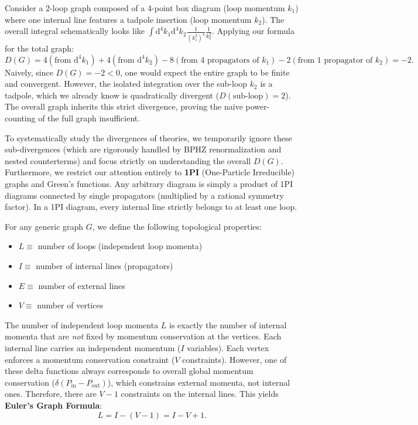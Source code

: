 \begin{example}
    Consider a 2-loop graph composed of a 4-point box diagram (loop momentum $k_1$) where one internal line features a tadpole insertion (loop momentum $k_2$).
    The overall integral schematically looks like $\int \mathrm{d}^4k_1 \mathrm{d}^4k_2 \frac{1}{(k_1^2)^4} \frac{1}{k_2^2}$.
    Applying our formula for the total graph:
    \[
        D(G) = 4 (\text{from } \mathrm{d}^4k_1) + 4 (\text{from } \mathrm{d}^4k_2) - 8 (\text{from } 4 \text{ propagators of } k_1) - 2 (\text{from } 1 \text{ propagator of } k_2) = -2.
    \]
    Naively, since $D(G) = -2 < 0$, one would expect the entire graph to be finite and convergent. However, the isolated integration over the sub-loop $k_2$ is a tadpole, which we already know is quadratically divergent ($D(\text{sub-loop}) = 2$). The overall graph inherits this strict divergence, proving the naive power-counting of the full graph insufficient.
\end{example}

To systematically study the divergences of theories, we temporarily ignore these sub-divergences (which are rigorously handled by BPHZ renormalization and nested counterterms) and focus strictly on understanding the overall $D(G)$.
Furthermore, we restrict our attention entirely to \textbf{1PI} (One-Particle Irreducible) graphs and Green's functions. Any arbitrary diagram is simply a product of 1PI diagrams connected by single propagators (multiplied by a rational symmetry factor). In a 1PI diagram, every internal line strictly belongs to at least one loop.

For any generic graph $G$, we define the following topological properties:
\begin{itemize}
    \item $L \equiv$ number of loops (independent loop momenta)
    \item $I \equiv$ number of internal lines (propagators)
    \item $E \equiv$ number of external lines
    \item $V \equiv$ number of vertices
\end{itemize}

The number of independent loop momenta $L$ is exactly the number of internal momenta that are \textit{not} fixed by momentum conservation at the vertices. Each internal line carries an independent momentum ($I$ variables). Each vertex enforces a momentum conservation constraint ($V$ constraints). However, one of these delta functions always corresponds to overall global momentum conservation ($\delta(P_{\text{in}} - P_{\text{out}})$), which constrains external momenta, not internal ones. Therefore, there are $V - 1$ constraints on the internal lines. This yields \textbf{Euler's Graph Formula}:
\[
    L = I - (V - 1) = I - V + 1.
\]

